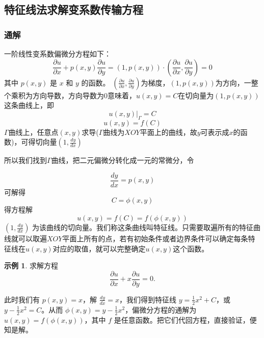 \documentclass[12pt,a4paper]{article}
\numberwithin{subsection}{section}   %
\numberwithin{subsubsection}{subsection}
\theoremstyle{plain}
\theoremstyle{definition}
\newtheorem{example}{示例}[subsection]  %
\theoremstyle{remark}
\theoremstyle{verification}
\begin{document}
	
	\subsection{特征线法求解变系数传输方程} 
	\subsubsection{通解} 
	一阶线性变系数偏微分方程如下：
	\begin{equation}\label{eq:pde_original2}
		\frac{\partial u}{\partial x} + p(x,y) \frac{\partial u}{\partial y}=(1, p(x, y)) \cdot \left( \frac{\partial u}{\partial x}, \frac{\partial u}{\partial y} \right) = 0 
	\end{equation}
	其中 $p(x, y)$ 是 $x$ 和 $y$ 的函数。
	$\left( \frac{\partial u}{\partial x}, \frac{\partial u}{\partial y} \right)$为梯度，$(1, p(x, y))$为方向，一整个乘积为方向导数，方向导数为0意味着，$u(x, y)=C$在切向量为$(1, p(x, y))$这条曲线上，即
	\begin{equation}
		u(x,y)|_{\Gamma} = C
	\end{equation}
	\begin{equation}
		u(x,y) =  f(C)
	\end{equation}
	$\Gamma$曲线上，任意点$(x, y)$求导($\Gamma$曲线为$XOY$平面上的曲线，故$y$可表示成$x$的函数)，可得切向量$(1,\frac{dy}{dx})$
	
	所以我们找到$\Gamma$曲线，把二元偏微分转化成一元的常微分，令
	
	\begin{equation}
		\frac{dy}{dx} = p(x, y)
	\end{equation}
	可解得
	\begin{equation}
		C=\phi(x,y)
	\end{equation}
	得方程解
	\begin{equation}
		u(x, y)=f(C)=f(\phi(x,y))
	\end{equation}
	$(1, \frac{dy}{dx})$
	为该曲线的切向量。我们称这条曲线叫特征线。只需要取遍所有的特征曲线就可以取遍$XOY$平面上所有的点，若有初始条件或者边界条件可以确定每条特征线在$u(x, y)$对应的取值，就可以完整确定$u(x, y)$这个函数。
	
	\begin{example}求解方程
		\begin{equation}
			\frac{\partial u}{\partial x} + x \frac{\partial u}{\partial y} = 0.
		\end{equation}
		
		此时我们有 $p(x, y) = x$，解 $\frac{dy}{dx} = x$，我们得到特征线 $y = \frac{1}{2}x^2 + C$，或 $y - \frac{1}{2}x^2 = C$。从而 $\phi(x, y) = y - \frac{1}{2}x^2$，偏微分方程的通解为 $u(x, y) = f(\phi(x, y))$，其中 $f$ 是任意函数。把它们代回方程，直接验证，便知是解。
	\end{example}
	
\end{document}
